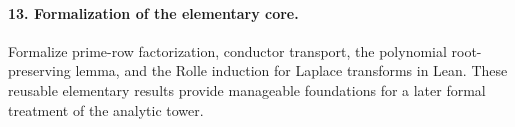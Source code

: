 \paragraph{13. Formalization of the elementary core.}
Formalize prime-row factorization, conductor transport, the polynomial
root-preserving lemma, and the Rolle induction for Laplace transforms
in Lean. These reusable elementary results provide manageable foundations
for a later formal treatment of the analytic tower.
